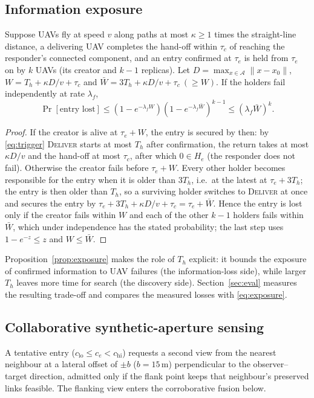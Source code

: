 \subsection{Information exposure}
\begin{proposition}\label{prop:exposure}
Suppose UAVs fly at speed $v$ along paths at most $\kappa\ge1$ times the straight-line distance, a
delivering UAV completes the hand-off within $\tau_c$ of reaching the responder's connected
component, and an entry confirmed at $\tau_e$ is held from $\tau_e$ on by $k$ UAVs (its creator
and $k-1$ replicas). Let $D=\max_{x\in\mathcal{A}}\|x-x_0\|$, $W=T_h+\kappa D/v+\tau_c$ and
$\bar W=3T_h+\kappa D/v+\tau_c\ (\ge W)$. If the holders fail independently at rate $\lambda_f$,
\begin{equation}
\Pr[\text{entry lost}]\le\left(1-e^{-\lambda_f W}\right)\left(1-e^{-\lambda_f\bar W}\right)^{k-1}\le(\lambda_f\bar W)^k.\label{eq:exposure}
\end{equation}
\end{proposition}
\begin{proof}
If the creator is alive at $\tau_e+W$, the entry is secured by then: by \eqref{eq:trigger}
\textsc{Deliver} starts at most $T_h$ after confirmation, the return takes at most $\kappa D/v$
and the hand-off at most $\tau_c$, after which $0\in H_e$ (the responder does not fail).
Otherwise the creator fails before $\tau_e+W$. Every other holder becomes responsible for the
entry when it is older than $3T_h$, i.e.\ at the latest at $\tau_e+3T_h$; the entry is then older than $T_h$, so a
surviving holder switches to \textsc{Deliver} at once and secures the entry by
$\tau_e+3T_h+\kappa D/v+\tau_c=\tau_e+\bar W$. Hence the entry is lost only if the creator fails within
$W$ and each of the other $k-1$ holders fails within $\bar W$, which under independence has the
stated probability; the last step uses $1-e^{-z}\le z$ and $W\le\bar W$.
\end{proof}
Proposition~\ref{prop:exposure} makes the role of $T_h$ explicit: it bounds the exposure of
confirmed information to UAV failures (the information-loss side), while larger $T_h$ leaves
more time for search (the discovery side). Section~\ref{sec:eval} measures the resulting
trade-off and compares the measured losses with \eqref{eq:exposure}.

\subsection{Collaborative synthetic-aperture sensing}
A tentative entry ($c_{\mathrm{lo}}\le c_e<c_{\mathrm{hi}}$) requests a second view from the
nearest neighbour at a lateral offset of $\pm b$ ($b=15$\,m) perpendicular to the observer--target
direction, admitted only if the flank point keeps that neighbour's preserved links feasible.
The flanking view enters the corroborative fusion below.

